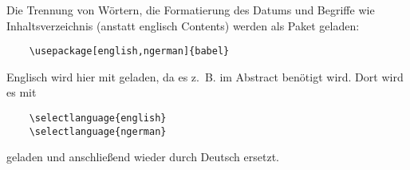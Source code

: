 Die Trennung von Wörtern, die Formatierung des Datums und Begriffe wie \glqq{}Inhaltsverzeichnis\grqq{} (anstatt englisch \glqq{}Contents\grqq{}) werden als Paket geladen:
\begin{verbatim}
	\usepackage[english,ngerman]{babel}
\end{verbatim}

Englisch wird hier mit geladen, da es z.~B. im Abstract benötigt wird. Dort wird es mit
\begin{verbatim}
	\selectlanguage{english}
	\selectlanguage{ngerman}
\end{verbatim}
geladen und anschließend wieder durch Deutsch ersetzt.